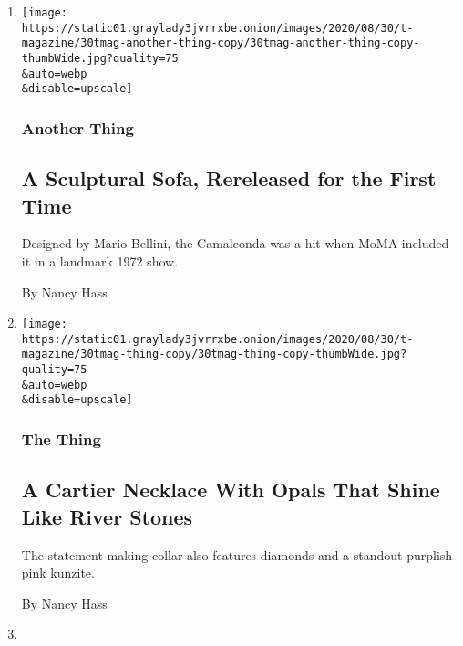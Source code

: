 \begin{enumerate}
\def\labelenumi{\arabic{enumi}.}
\item
  \href{/2020/08/28/t-magazine/bebitalia-camaleonda-sofa.html}{}

  \texttt{[image: https://static01.graylady3jvrrxbe.onion/images/2020/08/30/t-magazine/30tmag-another-thing-copy/30tmag-another-thing-copy-thumbWide.jpg?quality=75\\\&auto=webp\\\&disable=upscale]}

  \hypertarget{another-thing}{%
  \subsubsection{Another Thing}\label{another-thing}}

  \hypertarget{a-sculptural-sofa-rereleased-for-the-first-time}{%
  \subsection{A Sculptural Sofa, Rereleased for the First
  Time}\label{a-sculptural-sofa-rereleased-for-the-first-time}}

  Designed by Mario Bellini, the Camaleonda was a hit when MoMA included
  it in a landmark 1972 show.

  By Nancy Hass
\item
  \href{/2020/08/26/t-magazine/cartier-necklace-surnaturel.html}{}

  \texttt{[image: https://static01.graylady3jvrrxbe.onion/images/2020/08/30/t-magazine/30tmag-thing-copy/30tmag-thing-copy-thumbWide.jpg?quality=75\\\&auto=webp\\\&disable=upscale]}

  \hypertarget{the-thing}{%
  \subsubsection{The Thing}\label{the-thing}}

  \hypertarget{a-cartier-necklace-with-opals-that-shine-like-river-stones}{%
  \subsection{A Cartier Necklace With Opals That Shine Like River
  Stones}\label{a-cartier-necklace-with-opals-that-shine-like-river-stones}}

  The statement-making collar also features diamonds and a standout
  purplish-pink kunzite.

  By Nancy Hass
\item
  \href{/2020/07/21/t-magazine/charles-ross-artist.html}{}


\end{enumerate}
